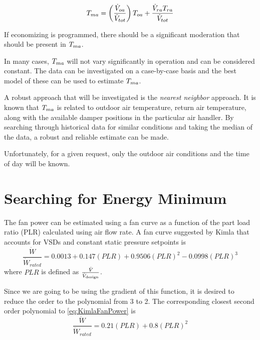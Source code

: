 \begin{equation}
    T_{ma} = \left(  \frac{\dot{V}_{oa}}{\dot{V}_{tot}}\right) T_{oa} + \frac{\dot{V}_{ra}T_{ra}}{\dot{V}_{tot}}
\end{equation}

If economizing is programmed, there should be a significant moderation that should be present in \(T_{ma}{}\).

In many cases, \(T_{ma}\) will not vary significantly in operation and can be considered constant. The data can be investigated on a case-by-case basis and the best model of these can be used to estimate \(T_{ma}\).

A robust approach that will be investigated is the \textit{nearest neighbor} approach. It is known that \(T_{ma}\) is related to outdoor air temperature, return air temperature, along with the available damper positions in the particular air handler. By searching through historical data for similar conditions and taking the median of the data, a robust and reliable estimate can be made. 

Unfortunately, for a given request, only the outdoor air conditions and the time of day will be known. 


\section{Searching for Energy Minimum}

The fan power can be estimated using a fan curve as a function of the part load ratio (PLR) calculated using air flow rate. A fan curve suggested by Kimla that accounts for VSDs and constant static pressure setpoints is
\begin{equation}\label{eq:KimlaFanPower}
\frac{\dot{W}}{\dot{W}_{rated}} = 0.0013+0.147\left(PLR \right)+0.9506\left(PLR \right)^2-0.0998\left(PLR \right)^3
\end{equation}
where \(PLR\) is defined as \(\frac{\dot{V}_{}}{\dot{V}_{\text{design}}}\).

Since we are going to be using the gradient of this function, it is desired to reduce the order to the polynomial from 3 to 2. The corresponding closest second order polynomial to \ref{eq:KimlaFanPower} is
\begin{equation}\label{eq:finalFanPower}
\frac{\dot{W}}{\dot{W}_{rated}} = 0.21\left(PLR \right)+0.8\left(PLR \right)^2
\end{equation}

